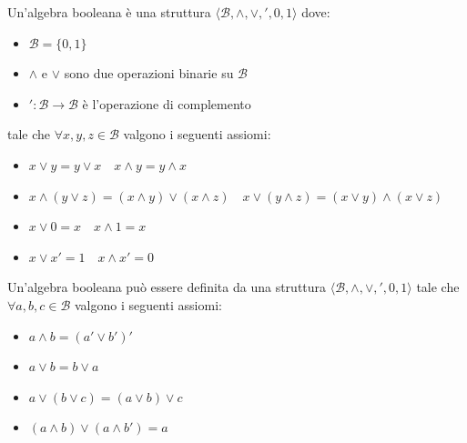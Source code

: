 \begin{definizione}
    Un'algebra booleana è una struttura $\langle \mathcal{B}, \land,\lor, ',0,1\rangle$ 
    dove:
    \begin{itemize}
        \item $\mathcal{B} = \{0,1\}$
        \item $\land$ e $\lor$ sono due operazioni binarie su $\mathcal{B}$
        \item $':\mathcal{B}\to \mathcal{B}$ è l'operazione di complemento
    \end{itemize}
    tale che $\forall x,y,z\in \mathcal{B}$ valgono i seguenti assiomi:
    \begin{itemize}
        \item $x\lor y = y\lor x \quad x\land y = y\land x $
        \item $x\land (y\lor z) = (x\land y) \lor (x\land z) \quad x\lor (y\land z) = (x\lor y) \land (x\lor z)$
        \item $x\lor 0 = x\quad x\land 1 = x$ 
        \item $x\lor x' = 1\quad x\land x' = 0$ 
    \end{itemize}
\end{definizione}

\begin{definizione}
    Un'algebra booleana può essere definita da una struttura $\langle \mathcal{B}, \land,\lor, ',0,1\rangle$ 
    tale che $\forall a,b,c\in \mathcal{B}$ valgono i seguenti assiomi:
    \begin{itemize}
        \item $a\land b = (a'\lor b')'$
        \item $a \lor b = b \lor a$
        \item $a\lor (b\lor c) = (a\lor b)\lor c$ 
        \item $(a\land b)\lor (a\land b') = a$ 
    \end{itemize}
\end{definizione}

